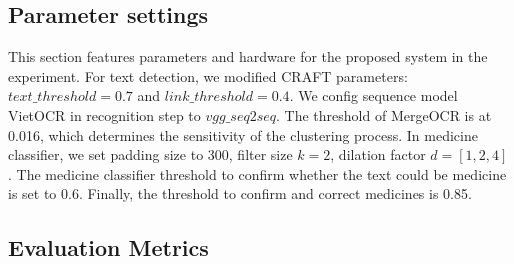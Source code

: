 

\subsection{Parameter settings}

This section features parameters and hardware for the proposed system in the experiment. For text detection, we modified CRAFT parameters: \(text\_threshold = 0.7\) and \(link\_threshold = 0.4\). We config sequence model VietOCR in recognition step to \(vgg\_seq2seq\). The threshold of MergeOCR is at 0.016, which determines the sensitivity of the clustering process. In medicine classifier, we set padding size to 300, filter size \(k = 2\), dilation factor \(d = [1, 2, 4]\). The medicine classifier threshold to confirm whether the text could be medicine is set to 0.6. Finally, the threshold to confirm and correct medicines is 0.85.

\subsection{Evaluation Metrics}

